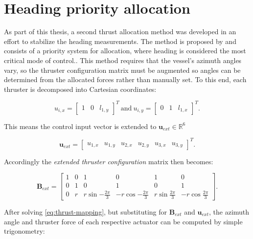 \chapter{Heading priority allocation}
\label{sec:heading-priority}
As part of this thesis, a second thrust allocation method was developed in an effort to stabilize the heading measurements. The method is proposed by \cite{millan2008thrust} and consists of a priority system for allocation, where heading is considered the most critical mode of control.. This method requires that the vessel's azimuth angles vary, so the thruster configuration matrix must be augmented so angles can be determined from the allocated forces rather than manually set. To this end, each thruster is decomposed into Cartesian coordinates:

\begin{equation}
    u_{i,x} = \begin{bmatrix}1 & 0 & l_{1,y} \end{bmatrix}^T \ \textrm{and} \  u_{i,y} = \begin{bmatrix}0 & 1 & l_{1,x}\end{bmatrix}^T.
\end{equation}

This means the control input vector is extended to $\mathbf{u}_{ext} \in \mathbb{R}^6$ 

\begin{equation}
    \boldsymbol{u}_{ext} = \begin{bmatrix} u_{1,x} & u_{1,y} & u_{2,x} & u_{2,y} & u_{3,x} & u_{3,y} \end{bmatrix}^T.
\end{equation}

Accordingly the \textit{extended thruster configuration} matrix then becomes: 

\begin{equation}
    \mathbf{B}_{ext} = \begin{bmatrix} 1 & 0 & 1 & 0  & 1 & 0  \\ 
    0 & 1 &  0 & 1 &  0 & 1 \\
    0 & r & r\sin{-\frac{2\pi}{3}} & -r\cos{-\frac{2\pi}{3}}  & r\sin{\frac{2\pi}{3}} & -r\cos{\frac{2\pi}{3}}\end{bmatrix}.
\end{equation}

After solving \eqref{eq:thrust-mapping}, but substituting for $\mathbf{B}_{ext}$ and $\mathbf{u}_{ext}$, the azimuth angle and thruster force of each respective actuator can be computed by simple trigonometry: 


